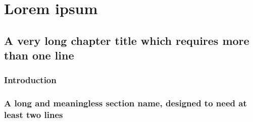 \part{Lorem ipsum}

\chapter{A very long chapter title which requires more than one line}

\section{Introduction}

\lipsum[1-2]


\section{A long and meaningless section name, designed to need at least two lines}

\lipsum[3-8]
